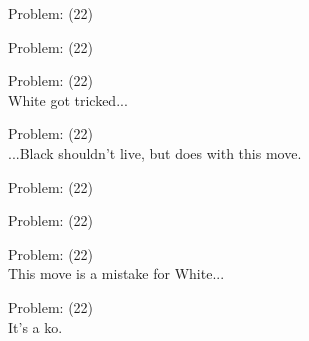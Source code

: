 \documentclass[11pt]{article}
\begin{document}
\begin{minipage}[t]{0.5\textwidth}
  {\centering
  
Problem: (22)\\
  }
\end{minipage}
\begin{minipage}[t]{0.5\textwidth}
  {\centering
  
Problem: (22)\\
  }
\end{minipage}
\begin{minipage}[t]{0.5\textwidth}
  {\centering
  
Problem: (22)\\
White got tricked...\\
  }
\end{minipage}
\begin{minipage}[t]{0.5\textwidth}
  {\centering
  
Problem: (22)\\
...Black shouldn't live, but does with this move.\\
  }
\end{minipage}
\begin{minipage}[t]{0.5\textwidth}
  {\centering
  
Problem: (22)\\
  }
\end{minipage}
\begin{minipage}[t]{0.5\textwidth}
  {\centering
  
Problem: (22)\\
  }
\end{minipage}
\begin{minipage}[t]{0.5\textwidth}
  {\centering
  
Problem: (22)\\
This move is a mistake for White...\\
  }
\end{minipage}
\begin{minipage}[t]{0.5\textwidth}
  {\centering
  
Problem: (22)\\
It's a ko.\\
  }
\end{minipage}
\end{document}
